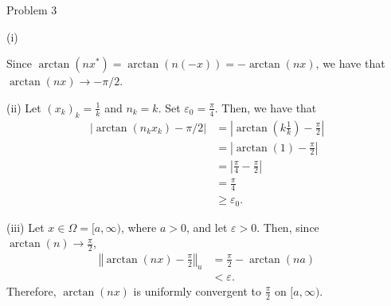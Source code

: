 \documentclass[8pt]{extarticle}
\begin{document}
\begin{problem}{Problem 3}
\begin{problem}{(i)}
\begin{description}
          Since $\arctan(nx^{\ast}) = \arctan(n(-x)) = -\arctan(nx)$, we have that $\arctan(nx) \rightarrow -\pi/2$.
      \end{description}
    \end{problem}
    \begin{problem}{(ii)}
      Let $(x_k)_k = \frac{1}{k}$ and $n_k = k$. Set $\varepsilon_0 = \frac{\pi}{4}$. Then, we have that
      \begin{align*}
        \left|\arctan(n_kx_k) - \pi/2\right| &= \left|\arctan\left(k\frac{1}{k}\right) - \frac{\pi}{2}\right|\\
                                             &= \left|\arctan(1)-\frac{\pi}{2}\right|\\
                                             &= \left|\frac{\pi}{4}-\frac{\pi}{2}\right|\\
                                             &=\frac{\pi}{4}\\
                                             &\geq \varepsilon_0.
      \end{align*}
    \end{problem}
    \begin{problem}{(iii)}
      Let $x\in \Omega =  [a,\infty)$, where $a > 0$, and let $\varepsilon > 0$. Then, since $\arctan(n)\rightarrow \frac{\pi}{2}$,
      \begin{align*}
        \left\Vert \arctan(nx) - \frac{\pi}{2}\right\Vert_u &= \frac{\pi}{2} - \arctan(na)\\
                                                            &< \varepsilon. \tag*{for sufficiently large $n$}
      \end{align*}
      Therefore, $\arctan(nx)$ is uniformly convergent to $\frac{\pi}{2}$ on $[a,\infty)$.
    \end{problem}
  \end{problem}
\end{document}
